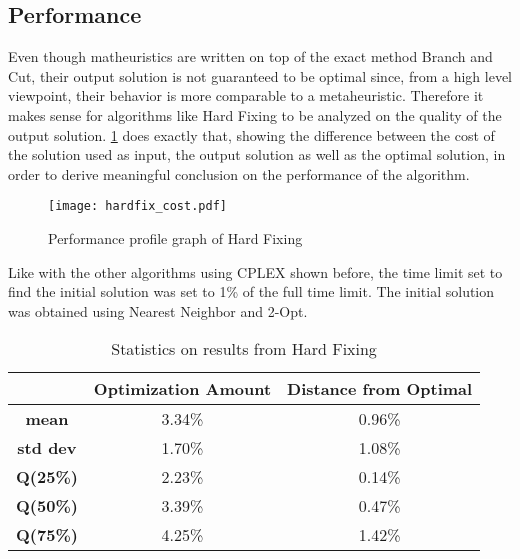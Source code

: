 \subsection{Performance}

Even though matheuristics are written on top of the exact method Branch and Cut, their output solution is not guaranteed to be optimal since, from a high level viewpoint, their behavior is more comparable to a metaheuristic.
Therefore it makes sense for algorithms like Hard Fixing to be analyzed on the quality of the output solution.
\figurename{ \ref{fig:hardfixCost}} does exactly that, showing the difference between the cost of the solution used as input, the output solution as well as the optimal solution, in order to derive meaningful conclusion on the performance of the algorithm.
\begin{figure}[htbp]
	\centering
	\texttt{[image: hardfix\_cost.pdf]}
	\caption{Performance profile graph of Hard Fixing\label{fig:hardfixCost}}
\end{figure}
Like with the other algorithms using CPLEX shown before, the time limit set to find the initial solution was set to 1\% of the full time limit.
The initial solution was obtained using Nearest Neighbor and 2-Opt.
\begin{table}[htbp]
	\centering
	\begin{tabular}{c|c|c|}
        & \textbf{Optimization Amount} & \textbf{Distance from Optimal} \\
		\hline \textbf{mean} & 3.34\% & 0.96\% \\
		\hline \textbf{std dev} & 1.70\% & 1.08\% \\
        \hline \textbf{Q(25\%)} & 2.23\% & 0.14\% \\
        \hline \textbf{Q(50\%)} & 3.39\% & 0.47\% \\
        \hline \textbf{Q(75\%)} & 4.25\% & 1.42\% \\
	\end{tabular}
    \vspace{2mm}
	\caption{Statistics on results from Hard Fixing} \label{tab:hardfixStats}
\end{table}

